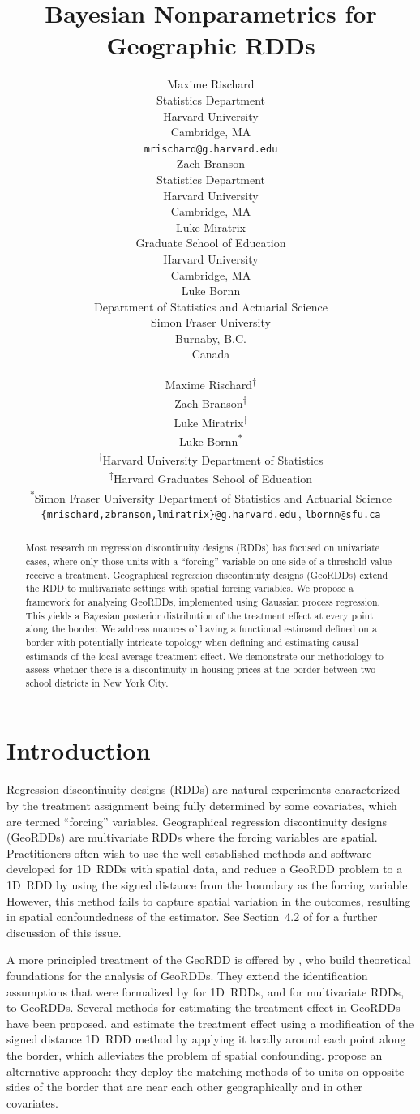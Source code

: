 \documentclass{article}
\title{Bayesian Nonparametrics for Geographic RDDs}
\author{
  Maxime Rischard \\
  Statistics Department \\
  Harvard University \\
  Cambridge, MA \\
  \texttt{mrischard@g.harvard.edu} \\
  \And
  Zach Branson \\
  Statistics Department \\
  Harvard University \\
  Cambridge, MA \\
  \And
  Luke Miratrix \\
  Graduate School of Education \\
  Harvard University \\
  Cambridge, MA \\
  \And
  Luke Bornn \\
  Department of Statistics and Actuarial Science\\
  Simon Fraser University\\
  Burnaby, B.C.\\
  Canada
}
\author{
Maxime Rischard\textsuperscript{$\dagger$}\\
\And
Zach Branson\textsuperscript{$\dagger$}\\
\And
Luke Miratrix\textsuperscript{$\ddagger$}\\
\And
Luke Bornn\textsuperscript{$\ast$}\\
\AND
\normalfont
\normalsize\textsuperscript{$\dagger$}Harvard University Department of Statistics\\
\normalsize\textsuperscript{$\ddagger$}Harvard Graduates School of Education\\
\normalsize\textsuperscript{$\ast$}Simon Fraser University Department of Statistics and Actuarial Science\\
\texttt{\{mrischard,zbranson,lmiratrix\}@g.harvard.edu}\,, \texttt{lbornn@sfu.ca}
}
\begin{document}


\maketitle

\begin{abstract}
    Most research on regression discontinuity designs (RDDs) has focused on univariate cases, where only those units with a ``forcing'' variable on one side of a threshold value receive a treatment.
    Geographical regression discontinuity designs (GeoRDDs) extend the RDD to multivariate settings with spatial forcing variables.
    We propose a framework for analysing GeoRDDs, implemented using Gaussian process regression. 
    This yields a Bayesian posterior distribution of the treatment effect at every point along the border.
    We address nuances of having a functional estimand defined on a border with potentially intricate topology when defining and estimating causal estimands of the local average treatment effect.
    We demonstrate our methodology to assess whether there is a discontinuity in housing prices at the border between two school districts in New York City.
\end{abstract}

\section{Introduction}\label{introduction}

Regression discontinuity designs (RDDs) are natural experiments characterized by the treatment assignment being fully determined by some covariates, which are termed ``forcing'' variables.
Geographical regression discontinuity designs (GeoRDDs) are multivariate RDDs where the forcing variables are spatial.
Practitioners often wish to use the well-established methods and software developed for 1D~RDDs with spatial data,
and reduce a GeoRDD problem to a 1D~RDD by using the signed distance from the boundary as the forcing variable.
However, this method fails to capture spatial variation in the outcomes, resulting in spatial confoundedness of the estimator.
See Section~4.2 of \cite{keele_titiunik_2015} for a further discussion of this issue.

A more principled treatment of the GeoRDD is offered by \cite{keele_titiunik_2015}, who build theoretical foundations for the analysis of GeoRDDs.
They extend the identification assumptions that were formalized by \cite{hahn2001identification} for 1D~RDDs, and \cite{imbens2011regression} for multivariate RDDs, to GeoRDDs.
Several methods for estimating the treatment effect in GeoRDDs have been proposed.
\cite{keele_titiunik_2015} and \cite{keeleoverview} estimate the treatment effect using a modification of the signed distance 1D~RDD method by applying it locally around each point along the border, which alleviates the problem of spatial confounding.
\cite{keele2015enhancing} propose an alternative approach: they deploy the matching methods of \cite{zubizarreta2012using} to units on opposite sides of the border that are near each other geographically and in other covariates.
\end{document}
